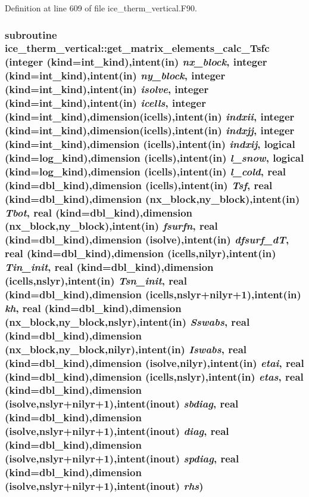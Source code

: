 Definition at line 609 of file ice\_\-therm\_\-vertical.F90.\hypertarget{namespaceice__therm__vertical_a40c9d90a69710b5b555fd78ff83c3009}{
\subsubsection[{get\_\-matrix\_\-elements\_\-calc\_\-Tsfc}]{\setlength{\rightskip}{0pt plus 5cm}subroutine ice\_\-therm\_\-vertical::get\_\-matrix\_\-elements\_\-calc\_\-Tsfc (integer (kind=int\_\-kind),intent(in) {\em nx\_\-block}, \/  integer (kind=int\_\-kind),intent(in) {\em ny\_\-block}, \/  integer (kind=int\_\-kind),intent(in) {\em isolve}, \/  integer (kind=int\_\-kind),intent(in) {\em icells}, \/  integer (kind=int\_\-kind),dimension(icells),intent(in) {\em indxii}, \/  integer (kind=int\_\-kind),dimension(icells),intent(in) {\em indxjj}, \/  integer (kind=int\_\-kind),dimension (icells),intent(in) {\em indxij}, \/  logical (kind=log\_\-kind),dimension (icells),intent(in) {\em l\_\-snow}, \/  logical (kind=log\_\-kind),dimension (icells),intent(in) {\em l\_\-cold}, \/  real (kind=dbl\_\-kind),dimension (icells),intent(in) {\em Tsf}, \/  real (kind=dbl\_\-kind),dimension (nx\_\-block,ny\_\-block),intent(in) {\em Tbot}, \/  real (kind=dbl\_\-kind),dimension (nx\_\-block,ny\_\-block),intent(in) {\em fsurfn}, \/  real (kind=dbl\_\-kind),dimension (isolve),intent(in) {\em dfsurf\_\-dT}, \/  real (kind=dbl\_\-kind),dimension (icells,nilyr),intent(in) {\em Tin\_\-init}, \/  real (kind=dbl\_\-kind),dimension (icells,nslyr),intent(in) {\em Tsn\_\-init}, \/  real (kind=dbl\_\-kind),dimension (icells,nslyr+nilyr+1),intent(in) {\em kh}, \/  real (kind=dbl\_\-kind),dimension (nx\_\-block,ny\_\-block,nslyr),intent(in) {\em Sswabs}, \/  real (kind=dbl\_\-kind),dimension (nx\_\-block,ny\_\-block,nilyr),intent(in) {\em Iswabs}, \/  real (kind=dbl\_\-kind),dimension (isolve,nilyr),intent(in) {\em etai}, \/  real (kind=dbl\_\-kind),dimension (icells,nslyr),intent(in) {\em etas}, \/  real (kind=dbl\_\-kind),dimension (isolve,nslyr+nilyr+1),intent(inout) {\em sbdiag}, \/  real (kind=dbl\_\-kind),dimension (isolve,nslyr+nilyr+1),intent(inout) {\em diag}, \/  real (kind=dbl\_\-kind),dimension (isolve,nslyr+nilyr+1),intent(inout) {\em spdiag}, \/  real (kind=dbl\_\-kind),dimension (isolve,nslyr+nilyr+1),intent(inout) {\em rhs})}}
\label{namespaceice__therm__vertical_a40c9d90a69710b5b555fd78ff83c3009}


